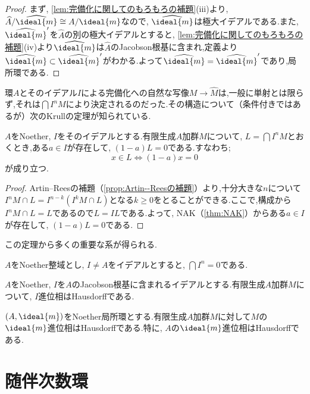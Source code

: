 \begin{proof}
	まず, \ref{lem:完備化に関してのもろもろの補題}(iii)より, $\widehat{A}/\widehat{\ideal{m}}\cong A/\ideal{m}$なので, $\widehat{\ideal{m}}$は極大イデアルである.また, $\widehat{\ideal{m}}'$を$\widehat{A}$の別の極大イデアルとすると, \ref{lem:完備化に関してのもろもろの補題}(iv)より$\widehat{\ideal{m}}$は$\widehat{A}$のJacobson根基に含まれ,定義より$\widehat{\ideal{m}}\subset\widehat{\ideal{m}}'$がわかる.よって$\widehat{\ideal{m}}=\widehat{\ideal{m}}'$であり,局所環である.
\end{proof}

環$A$とそのイデアル$I$による完備化への自然な写像$M\to\widehat{M}$は,一般に単射とは限らず,それは$\bigcap I^nM$により決定されるのだった.その構造について（条件付きではあるが）次のKrullの定理が知られている.

\begin{thm}[Krullの定理]
	$A$をNoether, $I$をそのイデアルとする.有限生成$A$加群$M$について, $L=\bigcap I^nM$とおくとき,ある$a\in I$が存在して, $(1-a)L=0$である.すなわち;
	\[x\in L\Longleftrightarrow (1-a)x=0\]
	が成り立つ.
\end{thm}

\begin{proof}
	Artin--Reesの補題（\ref{prop:Artin--Reesの補題}）より,十分大きな$n$について$I^n M\cap L=I^{n-k}(I^kM\cap L)$となる$k\geq0$をとることができる.ここで,構成から$I^n M\cap L=L$であるので$L=IL$である.よって, NAK（\ref{thm:NAK}）からある$a\in I$が存在して, $(1-a)L=0$である.
\end{proof}

この定理から多くの重要な系が得られる.

\begin{cor}
	$A$をNoether整域とし, $I\neq A$をイデアルとすると, $\bigcap I^n=0$である.
\end{cor}

\begin{cor}
	$A$をNoether, $I$を$A$のJacobson根基に含まれるイデアルとする.有限生成$A$加群$M$について, $I$進位相はHausdorffである.
\end{cor}

\begin{cor}
	$(A,\ideal{m})$をNoether局所環とする.有限生成$A$加群$M$に対して$M$の$\ideal{m}$進位相はHausdorffである.特に, $A$の$\ideal{m}$進位相はHausdorffである.
\end{cor}
\section{随伴次数環}

